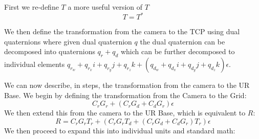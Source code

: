 \documentclass[12pt]{article}
\begin{document}
	First we re-define $T$ a more useful version of $T$
	\begin{equation}
	T = T^*
	\end{equation}
	
	We then define the transformation from the camera to the TCP using dual quaternions where given dual quaternion $q$ the dual quaternion can be decomposed into quaternions $q_r +  q_d$ which can be further decomposed to individual elements $q_{r_w} + q_{r_x} i + q_{r_y} j + q_{r_z} k + (q_{d_w} + q_{d_x} i + q_{d_y} j + q_{d_z} k)\epsilon$.
	
	We can now describe, in steps, the transformation from the camera to the UR Base. We begin by defining the transformation from the Camera to the Grid:
	\begin{equation}
		C_r G_r+(C_r G_d + C_d G_r)\epsilon
	\end{equation}
	We then extend this from the camera to the UR Base, which is equivalent to $R$:
	\begin{equation}
		R = C_r G_r T_r + (C_r G_r T_d + (C_r G_d + C_d G_r)T_r)\epsilon
	\end{equation}
	We then proceed to expand this into individual units and standard math:
\end{document}
